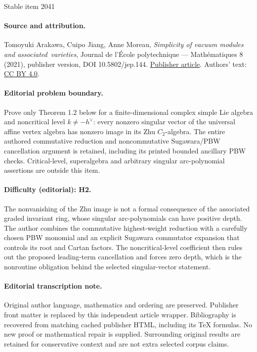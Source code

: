 \documentclass[11pt]{article}
\numberwithin{equation}{section}
\let\oldvee\vee
\renewcommand{\vee}{{\scriptscriptstyle\oldvee}}
\theoremstyle{definition}
\begin{document}
\begin{center}{\Large Stable item 2041}\end{center}
\paragraph{Source and attribution.}
Tomoyuki Arakawa, Cuipo Jiang, Anne Moreau, \emph{Simplicity of vacuum modules and associated varieties}, Journal de l’École polytechnique — Mathématiques 8 (2021), publisher version, DOI 10.5802/jep.144. \href{https://jep.centre-mersenne.org/articles/10.5802/jep.144/}{Publisher article}. Authors' text: \href{https://creativecommons.org/licenses/by/4.0/}{CC BY 4.0}.
\paragraph{Editorial problem boundary.}
Prove only Theorem 1.2 below for a finite-dimensional complex simple Lie algebra and noncritical level \(k\ne-h^\vee\): every nonzero singular vector of the universal affine vertex algebra has nonzero image in its Zhu \(C_2\)-algebra. The entire authored commutative reduction and noncommutative Sugawara/PBW cancellation argument is retained, including its printed bounded ancillary PBW checks. Critical-level, superalgebra and arbitrary singular arc-polynomial assertions are outside this item.
\paragraph{Difficulty (editorial): H2.}
The nonvanishing of the Zhu image is not a formal consequence of the associated graded invariant ring, whose singular arc-polynomials can have positive depth. The author combines the commutative highest-weight reduction with a carefully chosen PBW monomial and an explicit Sugawara commutator expansion that controls its root and Cartan factors. The noncritical-level coefficient then rules out the proposed leading-term cancellation and forces zero depth, which is the nonroutine obligation behind the selected singular-vector statement.
\paragraph{Editorial transcription note.}
Original author language, mathematics and ordering are preserved. Publisher front matter is replaced by this independent article wrapper. Bibliography is recovered from matching cached publisher HTML, including its TeX formulas. No new proof or mathematical repair is supplied. Surrounding original results are retained for conservative context and are not extra selected corpus claims.
\clearpage
\end{document}
